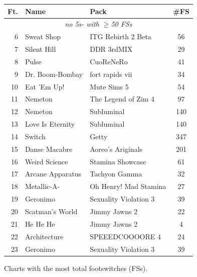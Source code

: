 \documentclass[10pt]{sigplanconf}
\begin{document}
\begin{figure}[t]
	\begin{center}
		\small
	\begin{tabular}{r|l|l|c}
		\bf Ft. & \bf Name & \bf Pack & \bf \#FS \\
		\hline
		\multicolumn{4}{c}{\em no 5s- with $\ge$50 FSs} \\
		 6 & Sweat Shop       & ITG Rebirth 2 Beta    &  56 \\
		 7 & Silent Hill      & DDR 3rdMIX            &  29 \\
		 8 & Pulse            & CuoReNeRo             &  41 \\
		 9 & Dr. Boom-Bombay  & fort rapids vii       &  34 \\
		10 & Eat 'Em Up!      & Mute Sims 5           &  54 \\
		11 & Nemeton          & The Legend of Zim 4   &  97 \\
		12 & Nemeton          & Subluminal            & 140 \\
		13 & Love Is Eternity & Subluminal            & 140 \\
		14 & Switch           & Getty                 & 347 \\
		15 & Danse Macabre    & Aoreo's Ariginals     & 201 \\
		16 & Weird Science    & Stamina Showcase      &  61 \\
		17 & Arcane Apparatus & Tachyon Gamma         &  32 \\
		18 & Metallic-A-      & Oh Henry! Mad Stamina &  27 \\
		19 & Geronimo         & Sexuality Violation 3 &  39 \\
		20 & Scatman's World  & Jimmy Jawns 2         &  22 \\
		21 & He He He         & Jimmy Jawns 2         &   4 \\
		22 & Architecture     & SPEEEDCOOOORE 4       &  24 \\
		23 & Geronimo         & Sexuality Violation 3 &  39 \\
	\end{tabular}
	\end{center}
	\caption{Charts with the most total footswitches (FSs).}
\end{figure}
\end{document}
